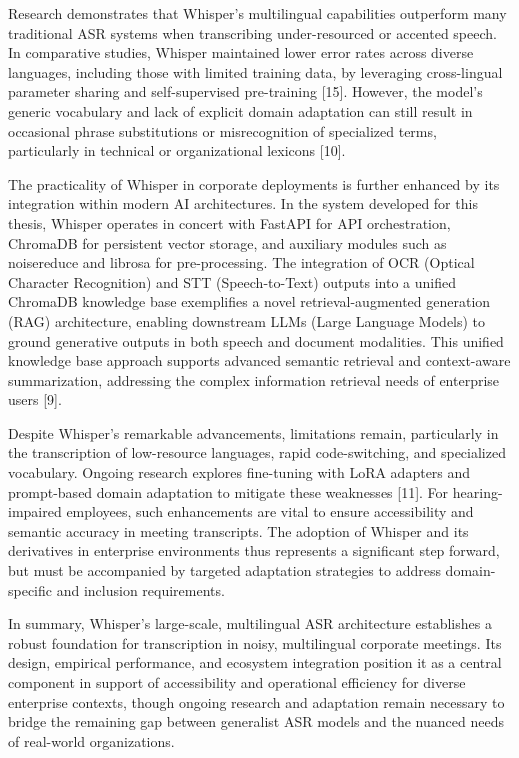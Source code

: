 \documentclass[12pt,a4paper]{article}
\begin{document}
Research demonstrates that Whisper’s multilingual capabilities outperform many traditional ASR systems when transcribing under-resourced or accented speech. In comparative studies, Whisper maintained lower error rates across diverse languages, including those with limited training data, by leveraging cross-lingual parameter sharing and self-supervised pre-training [15]. However, the model’s generic vocabulary and lack of explicit domain adaptation can still result in occasional phrase substitutions or misrecognition of specialized terms, particularly in technical or organizational lexicons [10].


The practicality of Whisper in corporate deployments is further enhanced by its integration within modern AI architectures. In the system developed for this thesis, Whisper operates in concert with FastAPI for API orchestration, ChromaDB for persistent vector storage, and auxiliary modules such as noisereduce and librosa for pre-processing. The integration of OCR (Optical Character Recognition) and STT (Speech-to-Text) outputs into a unified ChromaDB knowledge base exemplifies a novel retrieval-augmented generation (RAG) architecture, enabling downstream LLMs (Large Language Models) to ground generative outputs in both speech and document modalities. This unified knowledge base approach supports advanced semantic retrieval and context-aware summarization, addressing the complex information retrieval needs of enterprise users [9].


Despite Whisper’s remarkable advancements, limitations remain, particularly in the transcription of low-resource languages, rapid code-switching, and specialized vocabulary. Ongoing research explores fine-tuning with LoRA adapters and prompt-based domain adaptation to mitigate these weaknesses [11]. For hearing-impaired employees, such enhancements are vital to ensure accessibility and semantic accuracy in meeting transcripts. The adoption of Whisper and its derivatives in enterprise environments thus represents a significant step forward, but must be accompanied by targeted adaptation strategies to address domain-specific and inclusion requirements.


In summary, Whisper’s large-scale, multilingual ASR architecture establishes a robust foundation for transcription in noisy, multilingual corporate meetings. Its design, empirical performance, and ecosystem integration position it as a central component in support of accessibility and operational efficiency for diverse enterprise contexts, though ongoing research and adaptation remain necessary to bridge the remaining gap between generalist ASR models and the nuanced needs of real-world organizations.
\end{document}
